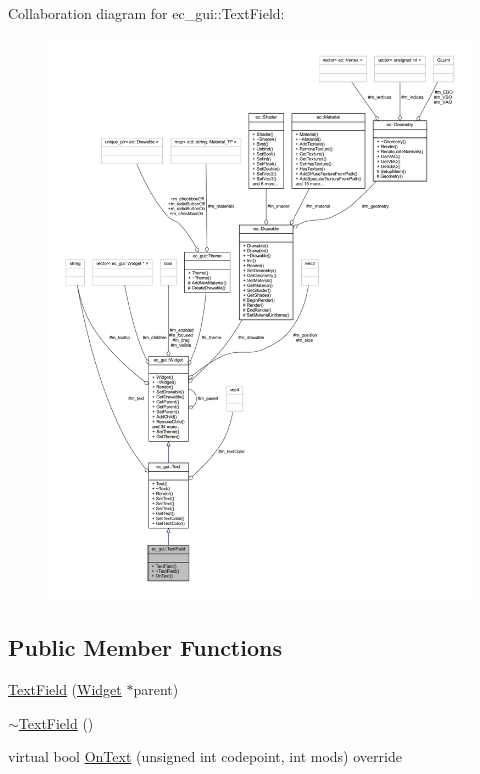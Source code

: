 Collaboration diagram for ec\+\_\+gui\+:\+:Text\+Field\+:\nopagebreak
\begin{figure}[H]
\begin{center}
\leavevmode
\includegraphics[width=350pt]{classec__gui_1_1_text_field__coll__graph}
\end{center}
\end{figure}
\subsection*{Public Member Functions}
\begin{DoxyCompactItemize}
\item 
\mbox{\hyperlink{classec__gui_1_1_text_field_a82c3e427aaa37f5a53a7561ef3d2e58e}{Text\+Field}} (\mbox{\hyperlink{classec__gui_1_1_widget}{Widget}} $\ast$parent)
\item 
\mbox{\hyperlink{classec__gui_1_1_text_field_a9c43ada308dc59b5a8728cc08cd8d8cb}{$\sim$\+Text\+Field}} ()
\item 
virtual bool \mbox{\hyperlink{classec__gui_1_1_text_field_a62a9512be0b6d2bf6b79f6e4aeadc9b3}{On\+Text}} (unsigned int codepoint, int mods) override
\end{DoxyCompactItemize}
